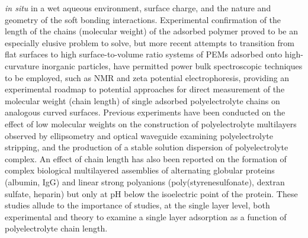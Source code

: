 \documentclass[twoside,twocolumn,9pt]{article}
\begin{document}
\textit{in situ} in a wet aqueous environment, surface charge, and the nature and geometry of the soft bonding interactions.\cite{Smith2004,Tanchak2004,Harroun2005,Burke2005,Tanchak2006}   Experimental confirmation of the length of the chains (molecular weight) of the adsorbed polymer proved to be an especially elusive problem to solve, but more recent attempts to transition from flat surfaces to high surface-to-volume ratio systems of PEMs adsorbed onto high-curvature inorganic particles, have permitted power bulk spectroscopic techniques to be employed, such as NMR and zeta potential electrophoresis,\cite{Burke2003,Mermut2003,Smith2004,Smith2003} providing an experimental roadmap to potential approaches for direct measurement of the molecular weight (chain length) of single adsorbed polyelectrolyte chains on analogous curved surfaces.  Previous experiments have been conducted on the effect of low molecular weights on the construction of polyelectrolyte multilayers observed by ellipsometry and optical waveguide examining polyelectrolyte stripping, and the production of a stable solution dispersion of polyelectrolyte complex.\cite{Sui2003}  An effect of chain length has also been reported on the formation of complex biological multilayered assemblies of alternating globular proteins (albumin, IgG) and linear strong polyanions (poly(styrenesulfonate), dextran sulfate, heparin) but only at pH below the isoelectric point of the protein.\cite{Houska2004}  These studies allude to the importance of studies, at the single layer level, both experimental and theory to examine a single layer adsorption as a function of polyelectrolyte chain length.
\end{document}
